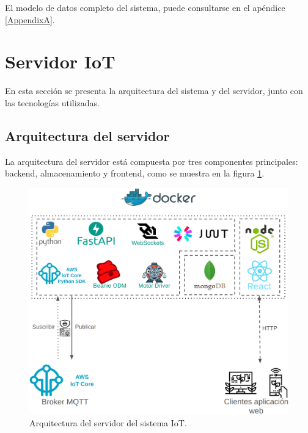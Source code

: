 El modelo de datos completo del sistema, puede consultarse en el apéndice
\ref{AppendixA}.

\section{Servidor IoT}

En esta sección se presenta la arquitectura del sistema y del servidor, junto
con las tecnologías utilizadas.

\subsection{Arquitectura del servidor}

\label{sec:arquitecturaServidor}

La arquitectura del servidor está compuesta por tres componentes principales:
backend, almacenamiento y frontend, como se muestra en la figura
\ref{fig:arquitectura servidor}.

\begin{figure}[H]
    \centering
    \includegraphics[width=\textwidth]{./Images/16.png}
    \caption{Arquitectura del servidor del sistema IoT.}
    \label{fig:arquitectura servidor}
\end{figure}

